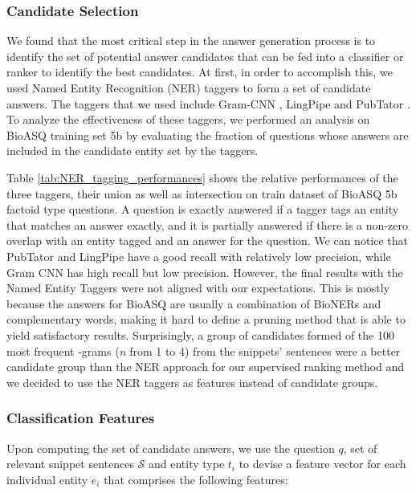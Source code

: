 \documentclass[11pt,a4paper]{article}
\begin{document}
\subsubsection{Candidate Selection}

We found that the most critical step in the answer generation process is to identify the set of potential answer candidates that can be fed into a classifier or ranker to identify the best candidates. At first, in order to accomplish this, we used Named Entity Recognition (NER) taggers to form a set of candidate answers. The taggers that we used include Gram-CNN \cite{gram-cnn}, LingPipe\cite{lingpipe} and PubTator \cite{pubtator}. To analyze the effectiveness of these taggers, we performed an analysis on BioASQ training set 5b by evaluating the fraction of questions whose answers are included in the candidate entity set by the taggers.

Table \ref{tab:NER_tagging_performances} shows the relative performances of the three taggers, their union as well as intersection on train dataset of BioASQ 5b factoid type questions. A question is exactly answered if a tagger tags an entity that matches an answer exactly, and it is partially answered if there is a non-zero overlap with an entity tagged and an answer for the question. We can notice that PubTator and LingPipe have a good recall with relatively low precision, while Gram CNN has high recall but low precision. However, the final results with the Named Entity Taggers were not aligned with our expectations. This is mostly because the answers for BioASQ are usually a combination of BioNERs and complementary words, making it hard to define a pruning method that is able to yield satisfactory results. Surprisingly, a group of candidates formed of the 100 most frequent -grams (\textit{n} from 1 to 4) from the snippets' sentences were a better candidate group than the NER approach for our supervised ranking method and we decided to use the NER taggers as features instead of candidate groups.


\subsubsection{Classification Features}\label{sec:classification_features}

Upon computing the set of candidate answers, we use the question $q$, set of relevant snippet sentences $\mathcal{S}$ and entity type $t_i$ to devise a feature vector for each individual entity $e_i$ that comprises the following features:
\end{document}
